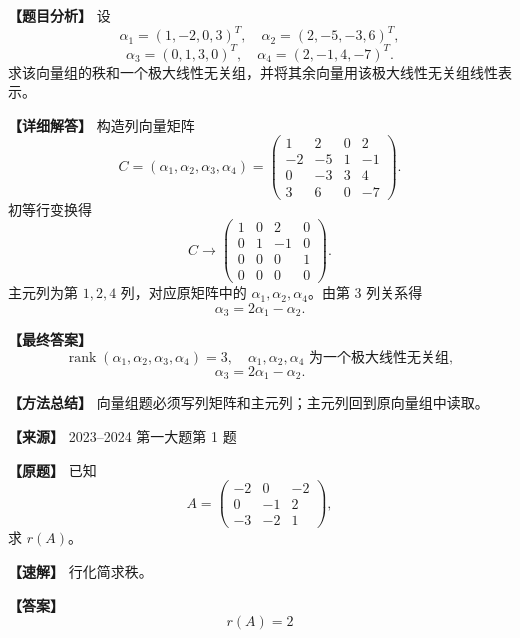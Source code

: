 \documentclass[11pt,a4paper,UTF8]{ctexart}
\newcommand{\rank}{\operatorname{rank}}
\begin{document}
\begin{answerbox}
\textbf{【题目分析】} 设
\[
\alpha_1=(1,-2,0,3)^T,\quad
\alpha_2=(2,-5,-3,6)^T,
\]
\[
\alpha_3=(0,1,3,0)^T,\quad
\alpha_4=(2,-1,4,-7)^T.
\]
求该向量组的秩和一个极大线性无关组，并将其余向量用该极大线性无关组线性表示。

\textbf{【详细解答】} 构造列向量矩阵
\[
C=(\alpha_1,\alpha_2,\alpha_3,\alpha_4)
=\begin{pmatrix}
1&2&0&2\\
-2&-5&1&-1\\
0&-3&3&4\\
3&6&0&-7
\end{pmatrix}.
\]
初等行变换得
\[
C\to
\begin{pmatrix}
1&0&2&0\\
0&1&-1&0\\
0&0&0&1\\
0&0&0&0
\end{pmatrix}.
\]
主元列为第 $1,2,4$ 列，对应原矩阵中的 $\alpha_1,\alpha_2,\alpha_4$。由第 $3$ 列关系得
\[
\alpha_3=2\alpha_1-\alpha_2.
\]

\textbf{【最终答案】}
\[
\rank(\alpha_1,\alpha_2,\alpha_3,\alpha_4)=3,
\quad \alpha_1,\alpha_2,\alpha_4\text{ 为一个极大线性无关组},
\]
\[
\alpha_3=2\alpha_1-\alpha_2.
\]

\textbf{【方法总结】} 向量组题必须写列矩阵和主元列；主元列回到原向量组中读取。
\end{answerbox}

\begin{answerbox}
\textbf{【来源】} 2023--2024 第一大题第 1 题

\textbf{【原题】}
已知
\[
A=\begin{pmatrix}-2&0&-2\\0&-1&2\\-3&-2&1\end{pmatrix},
\]
求 $r(A)$。

\textbf{【速解】}
行化简求秩。

\textbf{【答案】}
\[r(A)=2\]
\end{answerbox}
\end{document}
